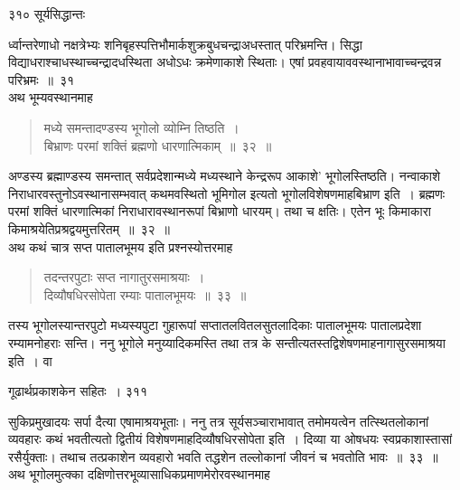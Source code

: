 \documentclass[11pt, openany]{book}
\begin{document}
\newpage


\noindent ३१० \hspace{4cm} सूर्यसिद्धान्तः
\vspace{1cm}


\noindent र्ध्वान्तरेणाधो नक्षत्रेभ्यः शनिबृहस्पत्तिभौमार्कशुक्रबुधचन्द्राअधस्तात् परिभ्रमन्ति। सिद्धा विद्याधराश्चाधस्थाच्चन्द्रादधस्थिता अधोऽधः क्रमेणाकाशे स्थिताः। एषां प्रवहवायाववस्थानाभावाच्चन्द्रवन्न परिभ्रमः~॥~३१~\\
\noindent अथ भूम्यवस्थानमाह \textendash

 \begin{quote}
{\ssi मध्ये समन्तादण्डस्य भूगोलो व्योम्नि तिष्ठति~।\\ 
बिभ्राणः परमां शक्तिं ब्रह्मणो धारणात्मिकाम्~॥~३२~॥}
\end{quote}
 अण्डस्य ब्रह्माण्डस्य समन्तात् सर्वप्रदेशान्मध्ये मध्यस्थाने केन्द्ररूप आकाशे' भूगोलस्तिष्ठति। नन्वाकाशे निराधारवस्तुनोऽवस्थानासम्भवात् कथमवस्थितो भूमिगोल इत्यतो भूगोलविशेषणमाह\textendash बिभ्राण इति~। ब्रह्मणः परमां शक्तिं धारणात्मिकां निराधारावस्थानरूपां बिभ्राणो धारयम्। तथा च क्षतिः। एतेन भूः किमाकारा किमाश्रयेतिप्रश्रद्वयमुत्तरितम्~॥~३२~॥\\
\noindent अथ कथं चात्र सप्त पातालभूमय इति प्रश्नस्योत्तरमाह\textendash 

\begin{quote}
{\ssi तदन्तरपुटाः सप्त नागातुरसमाश्रयाः~।\\
दिव्यौषधिरसोपेता रम्याः पातालभूमयः~॥~३३~॥ }
\end{quote}
 तस्य भूगोलस्यान्तरपुटो मध्यस्यपुटा गुहारूपां सप्तातलवितलसुतलादिकाः पातालभूमयः पातालप्रदेशा रम्यामनोहराः सन्ति। ननु भूगोले मनुय्यादिकमस्ति तथा तत्र के सन्तीत्यतस्तद्विशेषणमाह\textendash नागासुरसमाश्रया इति~। वा \textendash



\newpage


\hspace{3cm} गूढार्थप्रकाशकेन सहितः~। \hfill ३११
\vspace{1cm}


\noindent सुकिप्रमुखादयः सर्पा दैत्या एषामाश्रयभूताः। ननु तत्र सूर्यसञ्चाराभावात् तमोमयत्वेन तत्स्थितलोकानां व्यवहारः कथं भवतीत्यतो द्वितीयं विशेषणमाह\textendash दिव्यौषधिरसोपेता इति~। दिव्या या ओषधयः स्वप्रकाशास्तासां रसैर्युक्ताः। तथाच तत्प्रकाशेन व्यवहारो भवति तद्धशेन तल्लोकानां जीवनं च भवतोति भावः~॥~३३~॥\\
\noindent अथ भूगोलमुत्क्का दक्षिणोत्तरभूव्यासाधिकप्रमाणमेरोरवस्थानमाह \textendash
\end{document}
